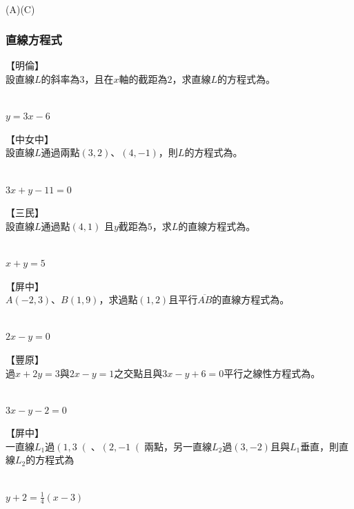 \documentclass
[answers]
{exam}
\newcommand\ul[1]{\uline{\hspace*{#1}}}
\theoremstyle{definition}
\begin{document}
\begin{questions}
\begin{solution}~\\
	(A)(C)
\end{solution}


\subsubsection{直線方程式}

\question
【明倫】\\
設直線$L$的斜率為$3$，且在$x$軸的截距為$2$，求直線$L$的方程式為\ul{50pt}。
\begin{solution}~\\
	$y = 3x - 6$
\end{solution}

\question
【中女中】\\
設直線$L$通過兩點$\left( 3,2\right)$、$\left( 4,-1\right)$，則$L$的方程式為\ul{50pt}。
\begin{solution}~\\
	$3x + y - 11 = 0$
\end{solution}

\question
【三民】\\
設直線$L$通過點$\left( 4,1\right)$ 且$y$截距為$5$，求$L$的直線方程式為\ul{50pt}。
\begin{solution}~\\
	$x + y = 5$
\end{solution}

\question
【屏中】\\
$A\left( -2,3\right)$、$B\left( 1,9\right)$，求過點$\left( 1,2\right)$且平行$\overline{AB}$的直線方程式為\ul{50pt}。
\begin{solution}~\\
	$2x - y = 0$
\end{solution}

\question
【豐原】\\
過$x+2y=3$與$2x-y=1$之交點且與$3x-y+6=0$平行之線性方程式為\ul{50pt}。
\begin{solution}~\\
	$3x - y - 2 = 0$
\end{solution}

\question
【屏中】\\
一直線$L_1$過$\left( 1,3\right($、$\left( 2,-1\right($兩點，另一直線$L_2$過$\left( 3,-2  \right)$且與$L_1$垂直，則直線$L_2$的方程式為\ul{50pt}
\begin{solution}~\\
	$y + 2 = \frac{1}{4} \left( x-3 \right)$
\end{solution}


\end{questions}
\end{document}
